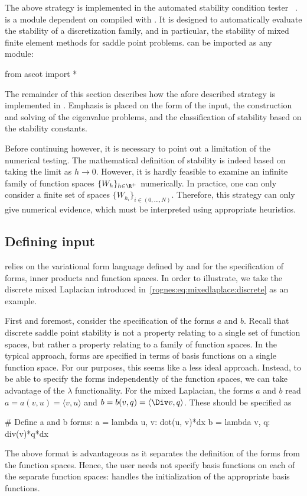 The above strategy is implemented in the automated stability condition
tester \rognesascot{}~\cite{Rognes2009}. \rognesascot{} is a
\rognespython{} module dependent on \pydolfin{} compiled with
\slepc{}. It is designed to automatically evaluate the stability of a
discretization family, and in particular, the stability of mixed
finite element methods for saddle point problems. \rognesascot{} can
be imported as any \rognespython{} module:
\begin{python}
  from ascot import *
\end{python}
The remainder of this section describes how the afore described
strategy is implemented in \rognesascot{}. Emphasis is placed on the form of
the input, the construction and solving of the eigenvalue problems,
and the classification of stability based on the stability constants.

Before continuing however, it is necessary to point out a limitation
of the numerical testing. The mathematical definition of stability is
indeed based on taking the limit as $h \rightarrow 0$. However, it is
hardly feasible to examine an infinite family of function spaces
$\{W_h\}_{h \in \R^{+}}$ numerically. In practice, one can only
consider a finite set of spaces $\{W_{h_i}\}_{i \in (0, \dots,
  N)}$. Therefore, this strategy can only give numerical evidence,
which must be interpreted using appropriate heuristics.

\subsection{Defining input}
\label{rognes:subsec:input}

\rognesascot{} relies on the variational form language defined by \ufl{} and
\pydolfin{} for the specification of forms, inner products and
function spaces.  In order to illustrate, we take the discrete mixed
Laplacian introduced in~\eqref{rognes:eq:mixedlaplace:discrete} as an
example.

First and foremost, consider the specification of the forms $a$ and
$b$. Recall that discrete saddle point stability is not a property
relating to a single set of function spaces, but rather a property
relating to a family of function spaces. In the typical \pydolfin{}
approach, forms are specified in terms of basis functions on a single
function space. For our purposes, this seems like a less ideal
approach. Instead, to be able to specify the forms independently of
the function spaces, we can take advantage of the \rognespython{}
$\lambda$ functionality. For the mixed Laplacian, the forms $a$ and
$b$ read $a = a(v, u) = \langle v, u \rangle$ and $b = b(v, q) =
\langle \Div v, q \rangle$. These should be specified as
\begin{python}
  # Define a and b forms:
  a = lambda u, v: dot(u, v)*dx
  b = lambda v, q: div(v)*q*dx
\end{python}
The above format is advantageous as it separates the definition of the
forms from the function spaces. Hence, the user needs not specify
basis functions on each of the separate function spaces: \rognesascot{}
handles the initialization of the appropriate basis functions.

